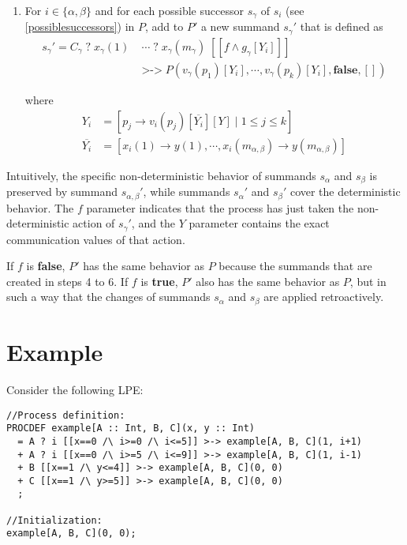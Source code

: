 \begin{enumerate}
\item For $i \in \{\alpha, \beta\}$ and for each possible successor $s_\gamma$ of $s_i$ (see \ref{possiblesuccessors}) in $P$, add to $P'$ a new summand ${s_\gamma}'$ that is defined as
\begin{align*}
{s_\gamma}' = C_\gamma \; \texttt{?} \; x_\gamma(1) \; &\cdots{} \; \texttt{?} \; x_\gamma(m_\gamma) \; [[f \land g_\gamma[Y_i]]] \\
&\texttt{>->} \; P(v_\gamma(p_1)[Y_i], \cdots{}, v_\gamma(p_k)[Y_i], \textbf{false}, [])
\end{align*}

where
\begin{align*}
Y_i &= [ p_j \rightarrow v_i(p_j)[\overline{Y_i}][Y] \;|\; 1 \leq j \leq k ] \\
\overline{Y_i} &= [x_i(1) \rightarrow y(1), \cdots{}, x_i(m_{\alpha,\beta}) \rightarrow y(m_{\alpha,\beta})]
\end{align*}

\end{enumerate}

Intuitively, the specific non-deterministic behavior of summands $s_\alpha$ and $s_\beta$ is preserved by summand ${s_{\alpha,\beta}}'$, while summands ${s_\alpha}'$ and ${s_\beta}'$ cover the deterministic behavior.
The $f$ parameter indicates that the process has just taken the non-deterministic action of ${s_\gamma}'$, and the $Y$ parameter contains the exact communication values of that action.

If $f$ is \textbf{false}, $P'$ has the same behavior as $P$ because the summands that are created in steps 4 to 6.
If $f$ is \textbf{true}, $P'$ also has the same behavior as $P$, but in such a way that the changes of summands $s_\alpha$ and $s_\beta$ are applied retroactively.

\section{Example}

Consider the following LPE:

\begin{lstlisting}
//Process definition:
PROCDEF example[A :: Int, B, C](x, y :: Int)
  = A ? i [[x==0 /\ i>=0 /\ i<=5]] >-> example[A, B, C](1, i+1)
  + A ? i [[x==0 /\ i>=5 /\ i<=9]] >-> example[A, B, C](1, i-1)
  + B [[x==1 /\ y<=4]] >-> example[A, B, C](0, 0)
  + C [[x==1 /\ y>=5]] >-> example[A, B, C](0, 0)
  ;

//Initialization:
example[A, B, C](0, 0);
\end{lstlisting}

